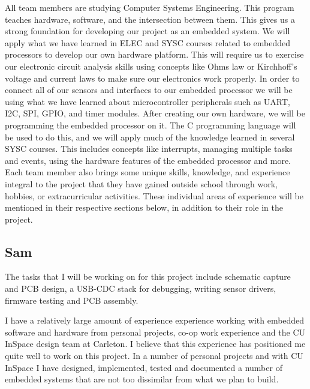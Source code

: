 
All team members are studying Computer Systems Engineering.  This program
teaches hardware, software, and the intersection between them.  This gives us a
strong foundation for developing our project as an embedded system.  We will
apply what we have learned in ELEC and SYSC courses related to embedded
processors to develop our own hardware platform.  This will require us to
exercise our electronic circuit analysis skills using concepts like Ohms law or
Kirchhoff’s voltage and current laws to make sure our electronics work
properly.  In order to connect all of our sensors and interfaces to our
embedded processor we will be using what we have learned about microcontroller
peripherals such as UART, I2C, SPI, GPIO, and timer modules.  After creating
our own hardware, we will be programming the embedded processor on it.  The C
programming language will be used to do this, and we will apply much of the
knowledge learned in several SYSC courses.  This includes concepts like
interrupts, managing multiple tasks and events, using the hardware features of
the embedded processor and more.  Each team member also brings some unique
skills, knowledge, and experience integral to the project that they have gained
outside school through work, hobbies, or extracurricular activities. These
individual areas of experience will be mentioned in their respective sections
below, in addition to their role in the project.





\subsection{Sam}

The tasks that I will be working on for this project include schematic capture
and PCB design, a USB-CDC stack for debugging, writing sensor drivers, firmware
testing and PCB assembly.

I have a relatively large amount of experience experience working with embedded
software and hardware from personal projects, co-op work experience and the
CU InSpace design team at Carleton.  I believe that this experience has
positioned me quite well to work on this project.  In a number of personal
projects and with CU InSpace I have designed, implemented, tested and documented
a number of embedded systems that are not too dissimilar from what we plan to
build.

